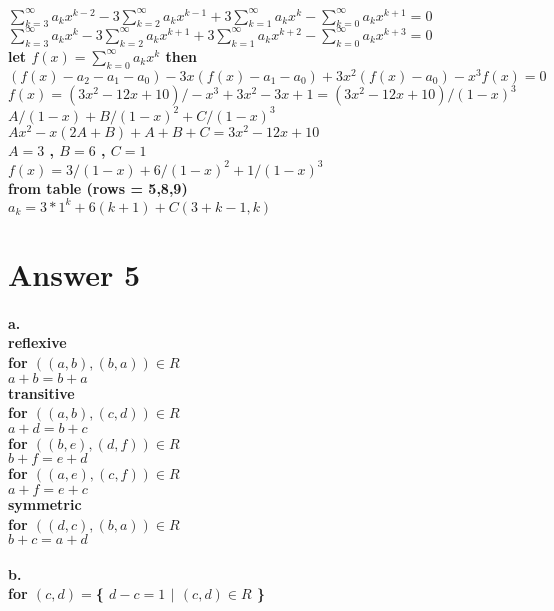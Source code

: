 \documentclass[11pt]{article}
\begin{document}
\paragraph{\\
$\sum_{k=3}^{\infty} a_kx^{k-2} - 3 \sum_{k=2}^{\infty} a_kx^{k-1} + 3 \sum_{k=1}^{\infty} a_kx^{k} - \sum_{k=0}^{\infty} a_kx^{k+1} =0$\\
$\sum_{k=3}^{\infty} a_kx^{k} - 3 \sum_{k=2}^{\infty} a_kx^{k+1} + 3 \sum_{k=1}^{\infty} a_kx^{k+2} - \sum_{k=0}^{\infty} a_kx^{k+3} =0$\\
let $f(x) = \sum_{k=0}^{\infty} a_kx^{k}$ then \\
$(f(x)-a_2-a_1-a_0)-3x(f(x)-a_1-a_0)+3x^2(f(x)-a_0)-x^3f(x)=0$\\
$f(x)=(3x^2-12x+10)/-x^3+3x^2-3x+1=(3x^2-12x+10)/(1-x)^3$\\
$A/(1-x)+ B/(1-x)^2 + C/(1-x)^3$\\
$Ax^2-x(2A+B)+A+B+C=3x^2-12x+10$\\
$A=3$ , $B=6$ , $C=1$\\
$f(x)=3/(1-x)+ 6/(1-x)^2 + 1/(1-x)^3 $\\
from table (rows = 5,8,9)\\
$a_k=3*1^k + 6(k+1)+ C(3+k-1,k)$}
\section*{Answer 5}
\paragraph{a.\\
reflexive \\
for $((a,b),(b,a)) \in R$  \\  $ a+b = b+a$\\
transitive\\
for $((a,b),(c,d)) \in R$  \\  $ a+d = b+c$\\
for $((b,e),(d,f)) \in R$\\
$b+f = e+d$\\
for $((a,e),(c,f)) \in R$\\
$a+f=e+c$\\
symmetric\\
for $((d,c),(b,a)) \in R$ \\ $b+c = a+d$
}
\paragraph{b.\\
for $(c,d) = $\{ $d-c =1$ $| $ $ (c,d) \in R$ \}}
\end{document}
